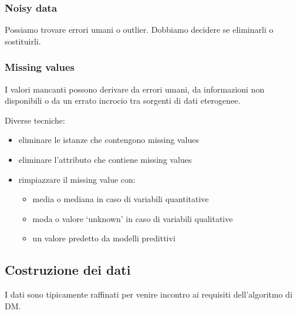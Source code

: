 \documentclass[11pt,onecolumn,a4paper,oneside]{book}
\begin{document}
\subsubsection{Noisy data}
Possiamo trovare errori umani o outlier. Dobbiamo decidere se eliminarli o sostituirli.

\subsubsection{Missing values}
I valori mancanti possono derivare da errori umani, da informazioni non disponibili o da un errato incrocio tra sorgenti di dati eterogenee.

Diverse tecniche:
\begin{itemize}
\item eliminare le istanze che contengono missing values
\item eliminare l'attributo che contiene missing values
\item rimpiazzare il missing value con:
\begin{itemize}
\item media o mediana in caso di variabili quantitative
\item moda o valore `unknown' in caso di variabili qualitative
\item un valore predetto da modelli predittivi
\end{itemize}
\end{itemize}

\subsection{Costruzione dei dati}


I dati sono tipicamente raffinati per venire incontro ai requisiti dell'algoritmo di DM.
\end{document}
